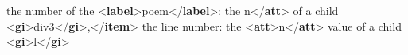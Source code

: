 \begin{shaded}
\hspace*{1em}\hspace*{1em}\hspace*{1em}\hspace*{1em}the number of the {<\textbf{label}>}poem{</\textbf{label}>}: the\mbox{}\newline 
\hspace*{1em}\hspace*{1em}\hspace*{1em}\hspace*{1em}n{</\textbf{att}>} of a child {<\textbf{gi}>}div3{</\textbf{gi}>},{</\textbf{item}>}\mbox{}\newline 
\hspace*{1em}\hspace*{1em}\hspace*{1em}\hspace*{1em}the line number: the {<\textbf{att}>}n{</\textbf{att}>} value of a\mbox{}\newline 
\hspace*{1em}\hspace*{1em}\hspace*{1em}\hspace*{1em}\hspace*{1em}\hspace*{1em}\hspace*{1em}\hspace*{1em}\hspace*{1em}\hspace*{1em} child {<\textbf{gi}>}l{</\textbf{gi}>}\mbox{}\newline 
\hspace*{1em}\hspace*{1em}\hspace*{1em}\hspace*{1em}\mbox{}\newline 
\hspace*{1em}\hspace*{1em}\hspace*{1em}\mbox{}\newline 
\hspace*{1em}\hspace*{1em}\mbox{}\newline 

\end{shaded}
